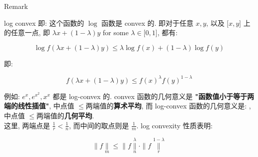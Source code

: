 \documentclass{qlnotes-export}
\begin{document}
\begin{qlremark}{Remark}

log convex 即: 这个函数的 \(\log\) 函数是 convex 的. 即对于任意 \(x,y\), 以及 \(\lbrack x,y\rbrack\) 上的任意一点, 即 \(\lambda x + (1 - \lambda)y\) for some \(\lambda \in \lbrack 0,1\rbrack\), 都有:

\[\log f(\lambda x + (1 - \lambda)y) \leq \lambda\log f(x) + (1 - \lambda)\log f(y)\]

即:

\[f(\lambda x + (1 - \lambda)y) \leq f(x)^{\lambda}f(y)^{1 - \lambda}\]

例如: \(e^{x},e^{x^{2}},x^{x}\) 都是 log-convex 的. convex 函数的几何意义是 \textbf{"函数值小于等于两端的线性插值"}, 中点值 \(\leq\)两端值的\textbf{算术平均}, 而 log-convex 函数的几何意义是: , 中点值 \(\leq\)两端值的\textbf{几何平均}.\\
这里, 两端点是 \(\frac{1}{r} < \frac{1}{n}\), 而中间的取点则是 \(\frac{1}{m}\). log convexity 性质表明:

\[\parallel f\underset{m}{\parallel} \leq \parallel f\underset{n}{\overset{\lambda}{\parallel}} \cdot \parallel f\underset{r}{\overset{1 - \lambda}{\parallel}}\]

\end{qlremark}
\end{document}
